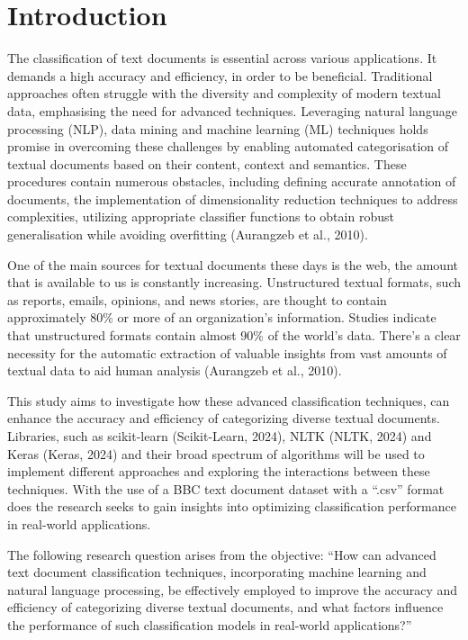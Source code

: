 \chapter{Introduction}

The classification of text documents is essential across various applications. It demands a high accuracy and efficiency, in order to be beneficial. Traditional approaches often struggle with the diversity and complexity of modern textual data, emphasising the need for advanced techniques. Leveraging natural language processing (NLP), data mining and machine learning (ML) techniques holds promise in overcoming these challenges by enabling automated categorisation of textual documents based on their content, context and semantics. These procedures contain numerous obstacles, including defining accurate annotation of documents, the implementation of dimensionality reduction techniques to address complexities, utilizing appropriate classifier functions to obtain robust generalisation while avoiding overfitting (Aurangzeb et al., 2010).

One of the main sources for textual documents these days is the web, the amount that is available to us is constantly increasing. Unstructured textual formats, such as reports, emails, opinions, and news stories, are thought to contain approximately 80\% or more of an organization's information. Studies indicate that unstructured formats contain almost 90\% of the world's data. There's a clear necessity for the automatic extraction of valuable insights from vast amounts of textual data to aid human analysis (Aurangzeb et al., 2010).

This study aims to investigate how these advanced classification techniques, can enhance the accuracy and efficiency of categorizing diverse textual documents. Libraries, such as scikit-learn (Scikit-Learn, 2024), NLTK (NLTK, 2024) and Keras (Keras, 2024) and their broad spectrum of algorithms will be used to implement different approaches and exploring the interactions between these techniques. With the use of a BBC text document dataset with a “.csv” format does the research seeks to gain insights into optimizing classification performance in real-world applications.

The following research question arises from the objective: “How can advanced text document classification techniques, incorporating machine learning and natural language processing, be effectively employed to improve the accuracy and efficiency of categorizing diverse textual documents, and what factors influence the performance of such classification models in real-world applications?”


